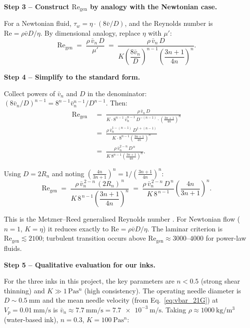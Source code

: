 \documentclass[11pt,a4paper]{article}
\newcommand{\Rey}{\mathrm{Re}}
\begin{document}
\begin{derivationbox}[title={DERIVATION --- Generalised (Metzner--Reed) Reynolds number}]
\medskip
\noindent\textbf{Step 3 -- Construct $\Rey_\mathrm{gen}$ by analogy with
the Newtonian case.}

For a Newtonian fluid, $\tau_w = \eta\cdot(8\bar v/D)$, and the Reynolds
number is $\Rey = \rho\bar v D/\eta$. By dimensional analogy, replace
$\eta$ with $\mu'$:
\begin{equation}
\Rey_\mathrm{gen}
\;=\; \frac{\rho\,\bar v_n\,D}{\mu'}
\;=\; \frac{\rho\,\bar v_n\,D}
           {K\!\left(\dfrac{8\bar v_n}{D}\right)^{\!n-1}\!\left(\dfrac{3n+1}{4n}\right)^{\!n}}.
\label{eq:Re_gen_step3}
\end{equation}

\medskip
\noindent\textbf{Step 4 -- Simplify to the standard form.}

Collect powers of $\bar v_n$ and $D$ in the denominator:
$(8\bar v_n/D)^{n-1} = 8^{n-1}\bar v_n^{n-1}/D^{n-1}$. Then:
\begin{align}
\Rey_\mathrm{gen}
  &\;=\; \frac{\rho\,\bar v_n\,D}
              {K\cdot 8^{n-1}\,\bar v_n^{n-1}\,D^{-(n-1)}
               \cdot\left(\frac{3n+1}{4n}\right)^{\!n}}
\nonumber\\
  &\;=\; \frac{\rho\,\bar v_n^{1-(n-1)}\,D^{1+(n-1)}}
              {K\cdot 8^{n-1}\left(\frac{3n+1}{4n}\right)^{\!n}}
\nonumber\\
  &\;=\; \frac{\rho\,\bar v_n^{2-n}\,D^{\,n}}
              {K\,8^{n-1}\left(\frac{3n+1}{4n}\right)^{\!n}}.
\label{eq:re_gen_step}
\end{align}

Using $D=2R_n$ and noting $\left(\frac{4n}{3n+1}\right)^n =
1/\left(\frac{3n+1}{4n}\right)^n$:
\begin{equation}
\boxed{
\Rey_\mathrm{gen}\;=\;
\frac{\rho\,\bar v_n^{\,2-n}\,(2R_n)^{\,n}}
{K\,8^{\,n-1}\!\left(\dfrac{3n+1}{4n}\right)^{\!n}}
\;=\;
\frac{\rho\,\bar v_n^{\,2-n}\,D^{\,n}}
{K\,8^{\,n-1}}\left(\frac{4n}{3n+1}\right)^{\!n}.
}
\label{eq:re_gen}
\end{equation}

This is the Metzner--Reed generalised Reynolds number \citep{MetznerReed1955}.
For Newtonian flow ($n=1$, $K=\eta$) it reduces exactly to
$\Rey=\rho\bar v D/\eta$. The laminar criterion is
$\Rey_\mathrm{gen}\lesssim 2100$; turbulent transition occurs above
$\Rey_\mathrm{gen}\approx 3000$--$4000$ for power-law fluids.

\medskip
\noindent\textbf{Step 5 -- Qualitative evaluation for our inks.}

For the three inks in this project, the key parameters are $n<0.5$ (strong
shear thinning) and $K\gg 1\,\si{\Pa\s^n}$ (high consistency). The
operating needle diameter is $D\sim\SI{0.5}{\mm}$ and the mean needle
velocity (from Eq.~\ref{eq:vbar_21G}) at $V_p=\SI{0.01}{\mm/\s}$ is
$\bar v_n \approx \SI{7.7}{\mm/\s}=\SI{7.7e-3}{\m/\s}$.
Taking $\rho\approx\SI{1000}{\kg/\m^3}$ (water-based ink),
$n=0.3$, $K=\SI{100}{\Pa\s^n}$:


\end{derivationbox}
\end{document}
